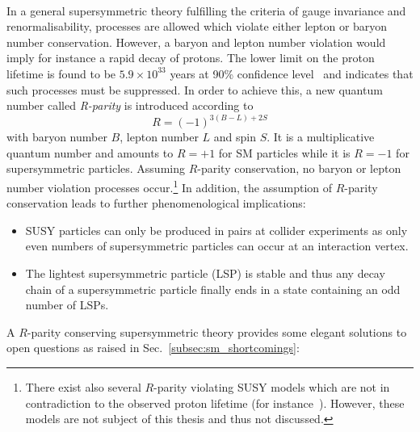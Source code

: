 \\
In a general supersymmetric theory fulfilling the criteria of gauge invariance and renormalisability, processes are allowed which violate either lepton or baryon number conservation. However, a baryon and lepton number violation would imply for instance a rapid decay of protons. The lower limit on the proton lifetime is found to be $5.9 \times 10^{33}$ years at 90\% confidence level~\cite{PhysRevD.90.072005} and indicates that such processes must be suppressed. In order to achieve this, a new quantum number called \textit{R-parity} is introduced according to  
\begin{equation*}
R = (-1)^{3(B-L) + 2S}
\end{equation*}
with baryon number $B$, lepton number $L$ and spin $S$. It is a multiplicative quantum number and amounts to $R= +1$ for SM particles while it is $R = -1$ for supersymmetric particles. Assuming $R$-parity conservation, no baryon or lepton number violation processes occur.\footnote{There exist also several $R$-parity violating SUSY models which are not in contradiction to the observed proton lifetime (\cf for instance~\cite{Martin:1997ns}). However, these models are not subject of this thesis and thus not discussed.} In addition, the assumption of $R$-parity conservation leads to further phenomenological implications:
\begin{itemize}
\item SUSY particles can only be produced in pairs at collider experiments as only even numbers of supersymmetric particles can occur at an interaction vertex.
\item The lightest supersymmetric particle (LSP) is stable and thus any decay chain of a supersymmetric particle finally ends in a state containing an odd number of LSPs.
\end{itemize}
A $R$-parity conserving supersymmetric theory provides some elegant solutions to open questions as raised in Sec.~\ref{subsec:sm_shortcomings}:
